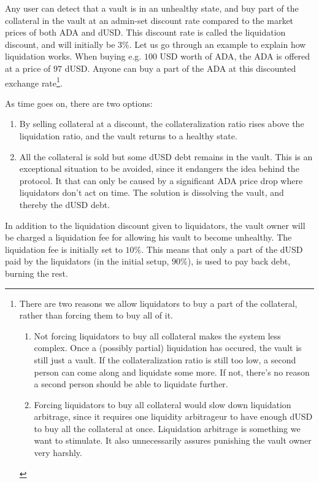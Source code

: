 \documentclass{article} %
\begin{document}
Any user can detect that a vault is in an unhealthy state, and buy part of the
collateral in the vault at an admin-set discount rate compared to the market
prices of both ADA and dUSD.
This discount rate is called the liquidation discount, and will initially be
$3\%$.
Let us go through an example to explain how liquidation works.
When buying e.g. $100$ USD worth of ADA, the ADA is offered at a price of $97$
dUSD.
Anyone can buy a part of the ADA at this discounted exchange
rate\footnote{
  There are two reasons we allow liquidators to buy a part of the collateral,
  rather than forcing them to buy all of it.
  \begin{enumerate}
    \item Not forcing liquidators to buy all collateral makes the system less
      complex. Once a (possibly partial) liquidation has occured, the vault is
      still just a vault. If the collateralization ratio is still too low, a
      second person can come along and liquidate some more. If not, there's no
      reason a second person should be able to liquidate further.
    \item Forcing liquidators to buy all collateral would slow down liquidation
      arbitrage, since it requires one liquidity arbitrageur to have enough dUSD
      to buy all the collateral at once.
      Liquidation arbitrage is something we want to stimulate.
      It also unnecessarily assures punishing the vault owner very harshly.
  \end{enumerate}
}.

As time goes on, there are two options:
\begin{enumerate}
  \item By selling collateral at a discount, the collateralization ratio rises
    above the liquidation ratio, and the vault returns to a healthy state.
  \item All the collateral is sold but some dUSD debt remains in the vault.
    This is an exceptional situation to be avoided, since it endangers the idea
    behind the protocol.
    It that can only be caused by a significant ADA price drop where liquidators
    don't act on time.
    The solution is dissolving the vault, and thereby the dUSD debt.
\end{enumerate}

In addition to the liquidation discount given to liquidators, the vault owner
will be charged a liquidation fee for allowing his vault to become unhealthy.
The liquidation fee is initially set to $10\%$.
This means that only a part of the dUSD paid by the liquidators (in the initial
setup, $90\%$), is used to pay back debt, burning the rest.
\end{document}
